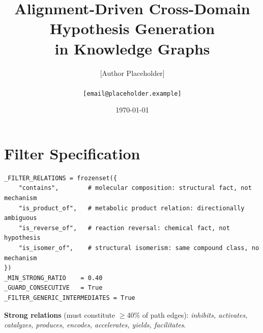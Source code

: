 \documentclass[11pt,a4paper]{article}
\title{Alignment-Driven Cross-Domain Hypothesis Generation\\
       in Knowledge Graphs}
\author{[Author Placeholder]\\
        [Institution Placeholder]\\
        \texttt{[email@placeholder.example]}}
\date{\today}
\begin{document}
\maketitle


























\appendix

\section{Filter Specification}
\label{app:filter}

\begin{verbatim}
_FILTER_RELATIONS = frozenset({
    "contains",        # molecular composition: structural fact, not mechanism
    "is_product_of",   # metabolic product relation: directionally ambiguous
    "is_reverse_of",   # reaction reversal: chemical fact, not hypothesis
    "is_isomer_of",    # structural isomerism: same compound class, no mechanism
})
_MIN_STRONG_RATIO    = 0.40
_GUARD_CONSECUTIVE   = True
_FILTER_GENERIC_INTERMEDIATES = True
\end{verbatim}

\noindent\textbf{Strong relations} (must constitute $\geq$40\% of path edges):
\textit{inhibits, activates, catalyzes, produces, encodes, accelerates, yields, facilitates}.
\end{document}
